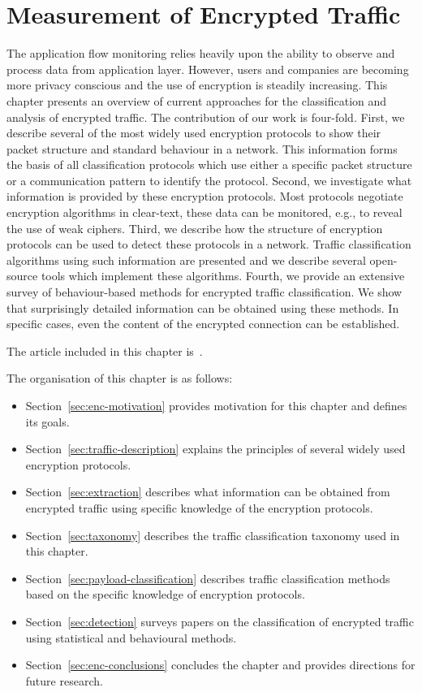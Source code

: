\chapter{Measurement of Encrypted Traffic} \label{chap:measurement-of-encrypted-traffic}

\begin{chapintro}

The application flow monitoring relies heavily upon the ability to observe and process data from application layer. However, users and companies are becoming more privacy conscious and the use of encryption is steadily increasing. This chapter presents an overview of current approaches for the classification and analysis of encrypted traffic. The contribution of our work is four-fold. First, we describe several of the most widely used encryption protocols to show their packet structure and standard behaviour in a network. This information forms the basis of all classification protocols which use either a specific packet structure or a communication pattern to identify the protocol. Second, we investigate what information is provided by these encryption protocols. Most protocols negotiate encryption algorithms in clear-text, these data can be monitored, e.g., to reveal the use of weak ciphers. Third, we describe how the structure of encryption protocols can be used to detect these protocols in a network. Traffic classification algorithms using such information are presented and we describe several open-source tools which implement these algorithms. Fourth, we provide an extensive survey of behaviour-based methods for encrypted traffic classification. We show that surprisingly detailed information can be obtained using these methods. In specific cases, even the content of the encrypted connection can be established.

The article included in this chapter is~\cite{Velan-2015-Survey}.

The organisation of this chapter is as follows:
\begin{itemize}
  \item Section~\ref{sec:enc-motivation} provides motivation for this chapter and defines its goals.
  \item Section~\ref{sec:traffic-description} explains the principles of several widely used encryption protocols.
  \item Section~\ref{sec:extraction} describes what information can be obtained from encrypted traffic using specific knowledge of the encryption protocols.
  \item Section~\ref{sec:taxonomy} describes the traffic classification taxonomy used in this chapter.
  \item Section~\ref{sec:payload-classification} describes traffic classification methods based on the specific knowledge of encryption protocols.
  \item Section~\ref{sec:detection} surveys papers on the classification of encrypted traffic using statistical and behavioural methods.
  \item Section~\ref{sec:enc-conclusions} concludes the chapter and provides directions for future research.
\end{itemize}


\end{chapintro}
